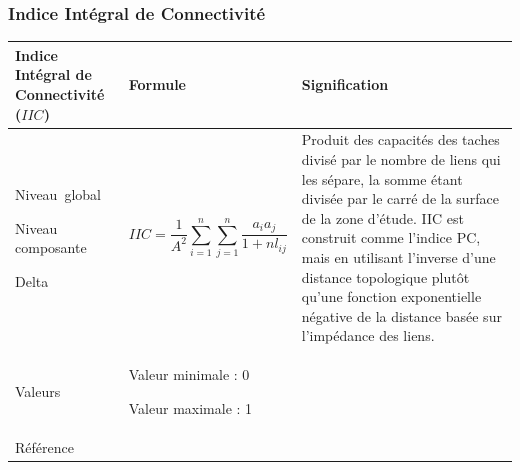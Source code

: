 \documentclass{article}
\begin{document}
\subsubsection{Indice Intégral de Connectivité}
\label{metric_IIC}
\begin{table}[H]
\begin{tabular}{|m{3.24cm}|m{4.4810004cm}m{7.924cm}|}

\hline
Indice Intégral de Connectivité ($IIC$) &
\multicolumn{1}{m{4.4810004cm}|}{Formule} &
Signification\\\hline
Niveau~global

Niveau composante

Delta &
\multicolumn{1}{m{4.4810004cm}|}{\begin{equation*}
\mathit{IIC}=\frac{1}{{A}^{2}}\sum _{i=1}^{n}{\sum _{j=1}^{n}{{\frac{{a}_{i}{a}_{j}}{{1+\mathit{nl}}_{\mathit{ij}}}}}}
\end{equation*}
} &
Produit des capacités des taches divisé par le nombre de liens qui les sépare, la somme étant divisée par le carré de la surface de la zone d’étude. IIC est construit comme l’indice PC, mais en utilisant l’inverse d’une distance topologique plutôt qu’une fonction exponentielle négative de la distance basée sur l’impédance des liens.

\\\hline
Valeurs &
\multicolumn{2}{m{12.6050005cm}|}{Valeur minimale : 0

Valeur maximale : 1

}\\\hline
Référence &
\multicolumn{2}{m{12.6050005cm}|}{\cite{Pascual2006}}\\\hline
\end{tabular}
\end{table}
\end{document}

